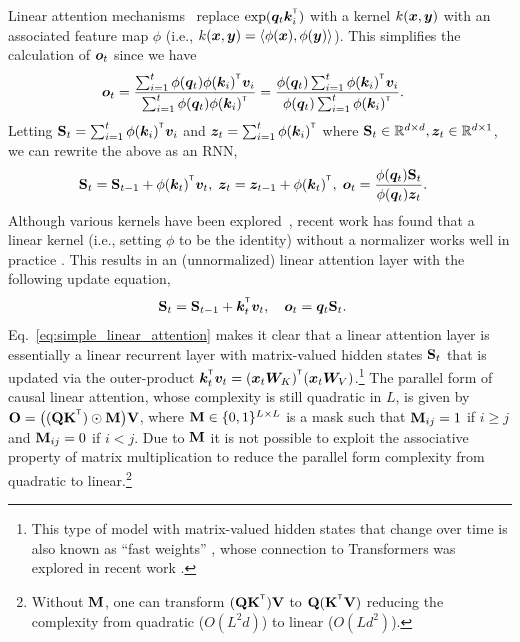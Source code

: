 Linear attention mechanisms~\citep{katharopoulos2020transformers} replace $\exp(\vq_t \vk_i^\intercal)$ with a kernel $k({\bm{x}}, {\bm{y}})$ with an associated feature map $\phi$ (i.e., $k({\bm{x}}, {\bm{y}}) = \langle\phi({\bm{x}}), \phi({\bm{y}})\rangle$).  This simplifies the calculation of ${\bm{o}}_t$ since we have
\begin{align*}
 \vo_t &= \frac{\sum_{i=1}^{ t}\phi(\vq_t)\phi(\vk_i)^\intercal \vv_i}{\sum_{i=1}^{t} \phi(\vq_t)\phi(\vk_i)^\intercal  }  
 = \frac{\phi(\vq_t)   \sum_{i=1}^{t}\phi(\vk_i)^\intercal \vv_i}{\phi(\vq_t) \sum_{i=1}^{t}\phi(\vk_i)^\intercal}.
\end{align*}
Letting $\rmS_t=\sum_{i=1}^{t}\phi(\vk_i)^\intercal \vv_i$ and $\vz_t=\sum_{i=1}^{t}\phi(\vk_i)^\intercal$ where ${\mathbf{S}}_t \in \mathbb{R}^{d\times d}, {\bm{z}}_t \in \mathbb{R}^{d\times 1}$, we can rewrite the above as an RNN,
\begin{align*}
\rmS_t = \rmS_{t-1} &+ \phi(\vk_t)^\intercal \vv_t, \hspace{1mm} \vz_t = \vz_{t-1} + \phi(\vk_t)^\intercal, \hspace{1mm} \vo_t = \frac{\phi(\vq_t) \rmS_t}{ \phi(\vq_t) \vz_t}.
\end{align*}
 Although various kernels have been explored~\citep{kasai-etal-2021-finetuning,peng2021random}, recent work has found that a linear kernel (i.e., setting $\phi$ to be the identity) without a normalizer  works well in practice \cite{sun2023retentive}. 
This results in an (unnormalized) linear attention layer with the following update equation,
\begin{align}
& \rmS_t = \rmS_{t-1} + \vk_t^\intercal \vv_t, \quad \vo_t = \vq_t \rmS_t   .
\label{eq:simple_linear_attention}
\end{align}
Eq.~\ref{eq:simple_linear_attention} makes it clear that  a linear attention layer is essentially a linear recurrent layer with matrix-valued hidden states ${\mathbf{S}}_t$ that is updated via the outer-product $\vk_t^\intercal\vv_t = (\vx_t \mW_K)^\intercal (\vx_t \mW_V)$.\footnote{This type of model with matrix-valued hidden states that change over time is also known as ``fast weights'' \citep{hinton1987using,schmidhuber1992learning,ba2016using}, whose connection to Transformers was  explored in recent work \citep{linear-xmr-fastweight,irie2021going,mao-2022-fine}.} 
The parallel form of causal linear attention, whose complexity is still quadratic in $L$, is given by
$\rmO = \big((\rmQ \rmK^\intercal) \odot \rmM \big)\rmV$,
where ${\mathbf{M}} \in \{0,1\}^{L \times L}$ is a mask such that ${\mathbf{M}}_{ij}=1$ if $i\ge j$ and ${\mathbf{M}}_{ij}=0$ if $i<j$. Due to ${\mathbf{M}}$ it is not possible to exploit the associative property of matrix multiplication to reduce the parallel form complexity from quadratic to linear.\footnote{Without ${\mathbf{M}}$, one can transform $(\rmQ \rmK^\intercal)\rmV$ to $\rmQ( \rmK^\intercal\rmV)$ reducing the complexity from quadratic ($O(L^2d)$) to linear ($O(Ld^2)$).}


